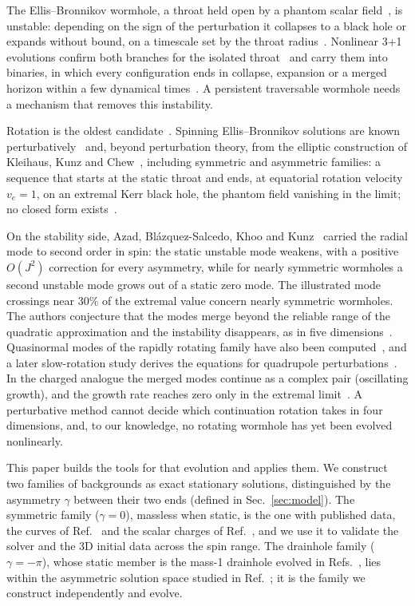 \documentclass[twocolumn,floatfix,aps,prd,superscriptaddress,nofootinbib]{revtex4-2}
\begin{document}
The Ellis--Bronnikov wormhole, a throat held open by a phantom scalar field~\cite{ellis1973,bronnikov1973,morris_thorne1988,visser1995}, is unstable: depending on the sign of the perturbation it collapses to a black hole or expands without bound, on a timescale set by the throat radius~\cite{gonzalez2009lin,gonzalez2009,shinkai2002,bronnikov2011,cremona2019}. Nonlinear 3+1 evolutions confirm both branches for the isolated throat~\cite{shirokov2026} and carry them into binaries, in which every configuration ends in collapse, expansion or a merged horizon within a few dynamical times~\cite{shirokov2026c}. A persistent traversable wormhole needs a mechanism that removes this instability.

Rotation is the oldest candidate~\cite{matos2006}. Spinning Ellis--Bronnikov solutions are known perturbatively~\cite{kashargin2008} and, beyond perturbation theory, from the elliptic construction of Kleihaus, Kunz and Chew~\cite{kleihaus_kunz2014,chew2016}, including symmetric and asymmetric families: a sequence that starts at the static throat and ends, at equatorial rotation velocity $v_e=1$, on an extremal Kerr black hole, the phantom field vanishing in the limit; no closed form exists~\cite{volkov2021}.

On the stability side, Azad, Bl\'azquez-Salcedo, Khoo and Kunz~\cite{azad2023,azad2024} carried the radial mode to second order in spin: the static unstable mode weakens, with a positive $O(J^2)$ correction for every asymmetry, while for nearly symmetric wormholes a second unstable mode grows out of a static zero mode. The illustrated mode crossings near $30\%$ of the extremal value concern nearly symmetric wormholes. The authors conjecture that the modes merge beyond the reliable range of the quadratic approximation and the instability disappears, as in five dimensions~\cite{dzhunushaliev2013}. Quasinormal modes of the rapidly rotating family have also been computed~\cite{khoo2024}, and a later slow-rotation study derives the equations for quadrupole perturbations~\cite{azad2025quad}. In the charged analogue the merged modes continue as a complex pair (oscillating growth), and the growth rate reaches zero only in the extremal limit~\cite{blazquez2025}. A perturbative method cannot decide which continuation rotation takes in four dimensions, and, to our knowledge, no rotating wormhole has yet been evolved nonlinearly.

This paper builds the tools for that evolution and applies them. We construct two families of backgrounds as exact stationary solutions, distinguished by the asymmetry $\gamma$ between their two ends (defined in Sec.~\ref{sec:model}). The symmetric family ($\gamma=0$), massless when static, is the one with published data, the curves of Ref.~\cite{kleihaus_kunz2014} and the scalar charges of Ref.~\cite{chew2016}, and we use it to validate the solver and the 3D initial data across the spin range. The drainhole family ($\gamma=-\pi$), whose static member is the mass-1 drainhole evolved in Refs.~\cite{shirokov2026,shirokov2026c}, lies within the asymmetric solution space studied in Ref.~\cite{chew2016}; it is the family we construct independently and evolve.
\end{document}
